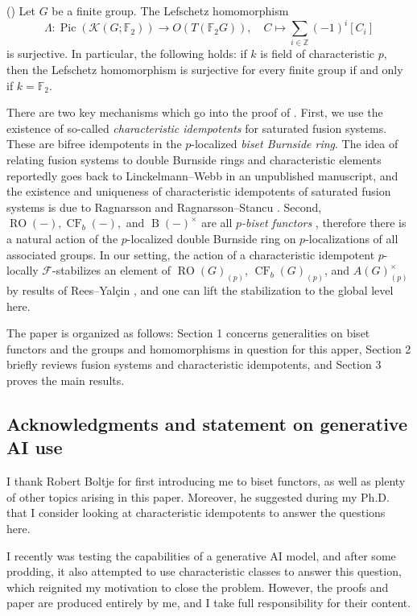 \documentclass[]{amsart}
\newcommand{\Pic}{\operatorname{Pic}}
\newcommand{\on}[1]{\operatorname{#1}}
\newcommand{\calF}{\mathcal{F}}
\newcommand{\catK}{\mathscr{K}}
\newcommand{\bbF}{\mathbb{F}}
\newcommand{\bbZ}{\mathbb{Z}}
\theoremstyle{remark}
\theoremstyle{definition}
\newenvironment{customthm}[1]
{\renewcommand\theinnercustomthm{#1}\innercustomthm}
{\endinnercustomthm}
\begin{document}
	\begin{customthm}{B}()
		Let $G$ be a finite group. The Lefschetz homomorphism \[\Lambda\colon \Pic(\catK(G;\bbF_2)) \to O(T(\bbF_2G)), \quad C \mapsto \sum_{i \in \bbZ} (-1)^i[C_i]\] is surjective. In particular, the following holds: if $k$ is field of characteristic $p$, then the Lefschetz homomorphism is surjective for every finite group if and only if $k = \bbF_2$.
	\end{customthm}
	
	There are two key mechanisms which go into the proof of . First, we use the existence of so-called \emph{characteristic idempotents} for saturated fusion systems. These are bifree idempotents in the $p$-localized \emph{biset Burnside ring}. The idea of relating fusion systems to double Burnside rings and characteristic elements reportedly goes back to Linckelmann--Webb in an unpublished manuscript, and the existence and uniqueness of characteristic idempotents of saturated fusion systems is due to Ragnarsson \cite{Rag06} and Ragnarsson--Stancu \cite{RS13}. 
	Second, $\on{RO}(-), \on{CF}_b(-),$ and $\on{B}(-)^\times$ are all \emph{$p$-biset functors} \cite{Bou10}, therefore there is a natural action of the $p$-localized double Burnside ring on $p$-localizations of all associated groups. In our setting, the action of a characteristic idempotent $p$-locally $\calF$-stabilizes an element of $\on{RO}(G)_{(p)}$, $\on{CF}_b(G)_{(p)}$, and $A(G)^\times_{(p)}$ by results of Rees--Yal\c{c}in \cite{RY18}, and one can lift the stabilization to the global level here. 
	
	The paper is organized as follows: Section 1 concerns generalities on biset functors and the groups and homomorphisms in question for this apper, Section 2 briefly reviews fusion systems and characteristic idempotents, and Section 3 proves the main results. 
	
	\subsection*{Acknowledgments and statement on generative AI use} I thank Robert Boltje for first introducing me to biset functors, as well as plenty of other topics arising in this paper. Moreover, he suggested during my Ph.D. that I consider looking at characteristic idempotents to answer the questions here. 
	
	I recently was testing the capabilities of a generative AI model, and after some prodding, it also attempted to use characteristic classes to answer this question, which reignited my motivation to close the problem. However, the proofs and paper are produced entirely by me, and I take full responsibility for their content. 
	
\end{document}
